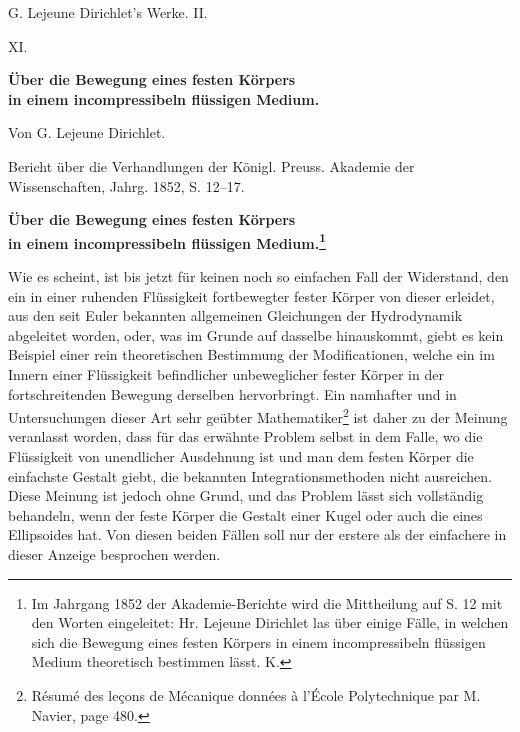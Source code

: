 \documentclass[11pt]{article}
\begin{document}
\begin{center}
{\Large G. Lejeune Dirichlet's Werke. II.}\par\vspace{1.2em}
{\Large XI.}\par\vspace{0.5em}
{\LARGE \textbf{Über die Bewegung eines festen Körpers\\ in einem incompressibeln flüssigen Medium.}}\par\vspace{1em}
{\large Von G. Lejeune Dirichlet.}\par\vspace{0.5em}
{\small Bericht über die Verhandlungen der Königl. Preuss. Akademie der Wissenschaften, Jahrg. 1852, S. 12--17.}
\end{center}

\begin{center}
{\large \textbf{Über die Bewegung eines festen Körpers\\ in einem incompressibeln flüssigen Medium.\footnote{Im Jahrgang 1852 der Akademie-Berichte wird die Mittheilung auf S. 12 mit den Worten eingeleitet: Hr. Lejeune Dirichlet las über einige Fälle, in welchen sich die Bewegung eines festen Körpers in einem incompressibeln flüssigen Medium theoretisch bestimmen lässt. K.}}}
\end{center}

Wie es scheint, ist bis jetzt für keinen noch so einfachen Fall der Widerstand, den ein in einer ruhenden Flüssigkeit fortbewegter fester Körper von dieser erleidet, aus den seit Euler bekannten allgemeinen Gleichungen der Hydrodynamik abgeleitet worden, oder, was im Grunde auf dasselbe hinauskommt, giebt es kein Beispiel einer rein theoretischen Bestimmung der Modificationen, welche ein im Innern einer Flüssigkeit befindlicher unbeweglicher fester Körper in der fortschreitenden Bewegung derselben hervorbringt. Ein namhafter und in Untersuchungen dieser Art sehr geübter Mathematiker\footnote{Résumé des leçons de Mécanique données à l'École Polytechnique par M. Navier, page 480.} ist daher zu der Meinung veranlasst worden, dass für das erwähnte Problem selbst in dem Falle, wo die Flüssigkeit von unendlicher Ausdehnung ist und man dem festen Körper die einfachste Gestalt giebt, die bekannten Integrationsmethoden nicht ausreichen. Diese Meinung ist jedoch ohne Grund, und das Problem lässt sich vollständig behandeln, wenn der feste Körper die Gestalt einer Kugel oder auch die eines Ellipsoides hat. Von diesen beiden Fällen soll nur der erstere als der einfachere in dieser Anzeige besprochen werden.
\end{document}
